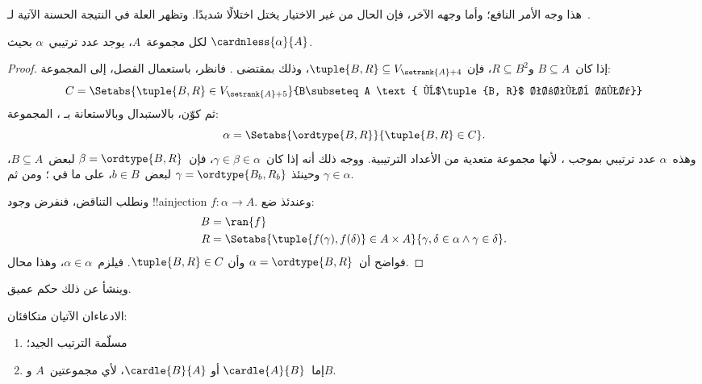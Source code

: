 \documentclass[../../../include/open-logic-section]{subfiles}
\begin{document}

هذا وجه الأمر النافع؛ وأما وجهه الآخر، فإن الحال من غير الاختيار يختل
اختلالًا شديدًا. وتظهر العلة في النتيجة الحسنة الآتية
لـ~\cite{Hartogs1915}.

\begin{lem}[\emph{في $\ZF$}]
لكل مجموعة~$A$، يوجد عدد ترتيبي~$\alpha$ بحيث
$\cardnless{\alpha}{A}$.
\end{lem}

\begin{proof}
إذا كان~$B \subseteq A$ و$R \subseteq B^2$، فإن
$\tuple{B, R} \subseteq V_{\setrank{A}+4}$، وذلك بمقتضى
. فانظر،
باستعمال الفصل، إلى المجموعة:
\[
	C = \Setabs{\tuple{B, R} \in V_{\setrank{A}+5}}{B\subseteq A
	\text{ و$\tuple{B, R}$ ترتيب جيد}}
\]
ثم كوّن، بالاستبدال وبالاستعانة بـ
، المجموعة:
\[
	\alpha = \Setabs{\ordtype{B, R}}{\tuple{B, R} \in C}.
\]
وهذه~$\alpha$ عدد ترتيبي بموجب
، لأنها مجموعة متعدية من
الأعداد الترتيبية. ووجه ذلك أنه إذا كان~$\gamma \in \beta \in \alpha$،
فإن~$\beta = \ordtype{B, R}$ لبعض~$B \subseteq A$، وحينئذ
$\gamma = \ordtype{B_b, R_b}$ لبعض~$b \in B$، على ما في
؛ ومن ثم
$\gamma \in \alpha$.

ونطلب التناقض، فنفرض وجود !!a{injection}
$f \colon \alpha \to A$. وعندئذ ضع:
\begin{align*}
	B &= \ran{f}\\
	R &= \Setabs{\tuple{f(\gamma), f(\delta)} \in A \times A}
	  {\gamma,\delta \in \alpha \land \gamma \in \delta}.
\end{align*}
فواضح أن~$\alpha = \ordtype{B, R}$ وأن
$\tuple{B, R} \in C$. فيلزم~$\alpha \in \alpha$، وهذا محال.
\end{proof}

وينشأ عن ذلك حكم عميق.

\begin{thm}[\emph{في $\ZF$}]
الادعاءان الآتيان متكافئان:
\begin{enumerate}
	\item{} مسلّمة الترتيب الجيد؛
	\item{} إما~$\cardle{A}{B}$ أو
	$\cardle{B}{A}$، لأي مجموعتين~$A$ و$B$.
\end{enumerate}
\end{thm}
\end{document}
